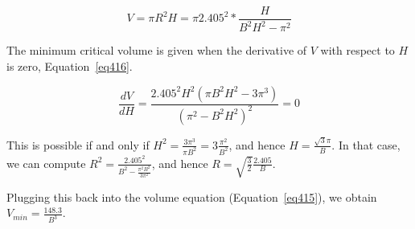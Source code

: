 \begin{equation}\label{eq415}
V = \pi R^2 H = \pi 2.405^2 * \frac{H}{B^2H^2-\pi^2}
\end{equation}

The minimum critical volume is given when the derivative of $V$ with respect to $H$ is zero, Equation~\ref{eq416}.


\begin{equation}\label{eq416}
\frac{dV}{dH} = \frac{2.405^2 H^2(\pi B^2H^2 - 3\pi^3)}{(\pi^2 - B^2H^2)^2} = 0
\end{equation}

This is possible if and only if $H^2 = \frac{3\pi^3}{\pi B^2} = 3\frac{\pi^2}{B^2}$, and hence $H = \frac{\sqrt{3}\pi}{B}$. In that case, we can compute $R^2 = \frac{2.405^2}{B^2-\frac{\pi^2 B^2}{3\pi^2}}$, and hence $R = \sqrt{\frac{3}{2}}\frac{2.405}{B}$.

Plugging this back into the volume equation (Equation~\ref{eq415}), we obtain $V_{min} = \frac{148.3}{B^3}$.

